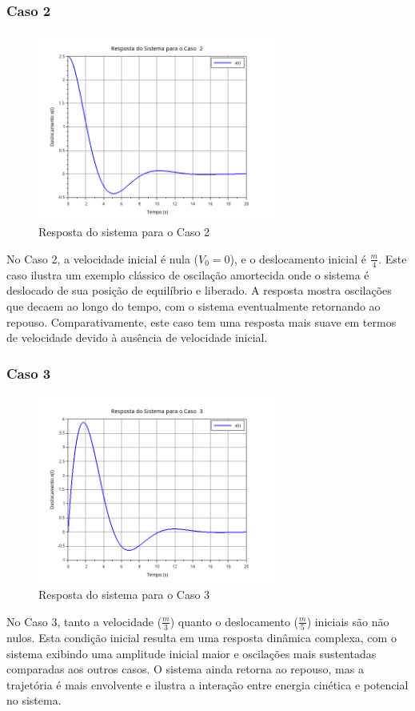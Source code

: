 \subsubsection{Caso 2}
\begin{figure}[H]
    \centering
    \includegraphics[width=0.7\textwidth]{1-atividade/assets/caso2.png}
    \caption{Resposta do sistema para o Caso 2}
\end{figure}
No Caso 2, a velocidade inicial é nula (\( V_0 = 0 \)), e o deslocamento inicial é \( \frac{m}{4} \). Este caso ilustra um exemplo clássico de oscilação amortecida onde o sistema é deslocado de sua posição de equilíbrio e liberado. A resposta mostra oscilações que decaem ao longo do tempo, com o sistema eventualmente retornando ao repouso. Comparativamente, este caso tem uma resposta mais suave em termos de velocidade devido à ausência de velocidade inicial.

\subsubsection{Caso 3}
\begin{figure}[H]
    \centering
    \includegraphics[width=0.7\textwidth]{1-atividade/assets/caso3.png}
    \caption{Resposta do sistema para o Caso 3}
\end{figure}
No Caso 3, tanto a velocidade (\( \frac{m}{3} \)) quanto o deslocamento (\( \frac{m}{5} \)) iniciais são não nulos. Esta condição inicial resulta em uma resposta dinâmica complexa, com o sistema exibindo uma amplitude inicial maior e oscilações mais sustentadas comparadas aos outros casos. O sistema ainda retorna ao repouso, mas a trajetória é mais envolvente e ilustra a interação entre energia cinética e potencial no sistema.

